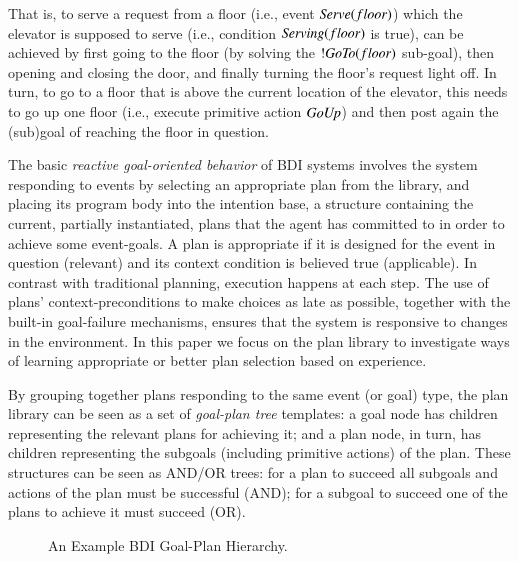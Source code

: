 That is, to serve a request from a floor (i.e., event ${\mbox{\textit{Serve}}}(floor)$)
which the elevator is supposed to serve (i.e., condition ${\mbox{\textit{Serving}}}(floor)$ is
true), can be achieved by first going to the floor (by solving the
$!{\mbox{\textit{GoTo}}}(floor)$ sub-goal), then opening and closing the door, and finally
turning the floor's request light off.
In turn, to go to a floor that is above the current location of the elevator,
this needs to go up one floor (i.e., execute primitive action ${\mbox{\textit{GoUp}}}$) and then
post again the (sub)goal of reaching the floor in question.





The basic \emph{reactive goal-oriented behavior} of BDI systems involves the
system responding to events by selecting an appropriate plan from the library,
and placing its program body into the intention base, a structure containing the
current, partially instantiated, plans that the agent has committed to in order
to achieve some event-goals.
A plan is appropriate if it is designed for the event in question (relevant) and
its context condition is believed true (applicable).
In contrast with traditional planning, execution happens at each step. The use of
plans' context-preconditions to make choices as late as possible, together with
the built-in goal-failure mechanisms, ensures that the system is responsive to
changes in the environment.
In this paper we focus on the plan library to investigate ways of learning
appropriate or better plan selection based on experience.

By grouping together plans responding to the same
event (or goal) type, the plan library can be seen as a set of \emph{goal-plan tree}
templates: a goal node has children representing the
relevant plans for achieving it; and a plan node, in turn, has children
representing the subgoals (including primitive actions) of the plan.
These structures can be seen as AND/OR trees: for a plan to succeed all
subgoals and actions of the plan must be successful (AND); for a subgoal to
succeed one of the plans to achieve it must succeed (OR).

\begin{figure}[t]
\begin{center}
\resizebox{.6\textwidth}{!}{}
\end{center}
\vskip -0.5cm
\caption{An Example BDI Goal-Plan Hierarchy.}
\label{fig:T3}
\end{figure}

